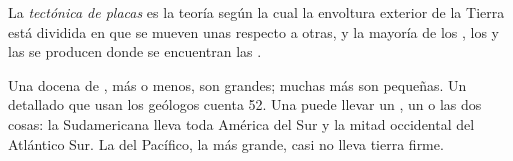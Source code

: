 \begin{definition}\label{def:g7:plate-tectonics:plate-tectonics}
La \emph{tectónica de placas}
es la teoría según la cual la envoltura exterior de la Tierra está dividida
en  que se mueven unas respecto a otras, y la mayoría de los
, los  y las  se producen donde se encuentran
las .
\end{definition}

\begin{remark}\label{rem:g7:plate-tectonics:how-many}
Una docena de , más o menos, son grandes; muchas más son pequeñas. Un
 detallado que usan los geólogos cuenta 52. Una  puede llevar un
, un  o las dos cosas: la  Sudamericana lleva toda
América del Sur y la mitad occidental del Atlántico Sur. La  del
Pacífico, la más grande, casi no lleva tierra firme.
\end{remark}

